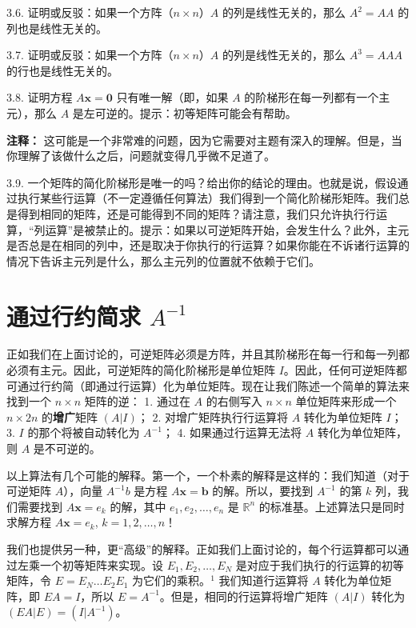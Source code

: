 3.6. 证明或反驳：如果一个方阵（$n \times n$）$A$ 的列是线性无关的，那么 $A^2 = AA$ 的列也是线性无关的。

3.7. 证明或反驳：如果一个方阵（$n \times n$）$A$ 的列是线性无关的，那么 $A^3 = AAA$ 的行也是线性无关的。

3.8. 证明方程 $A \mathbf{x} = \mathbf{0}$ 只有唯一解（即，如果 $A$ 的阶梯形在每一列都有一个主元），那么 $A$ 是左可逆的。提示：初等矩阵可能会有帮助。

\textbf{注释：} 这可能是一个非常难的问题，因为它需要对主题有深入的理解。但是，当你理解了该做什么之后，问题就变得几乎微不足道了。

3.9. 一个矩阵的简化阶梯形是唯一的吗？给出你的结论的理由。也就是说，假设通过执行某些行运算（不一定遵循任何算法）我们得到一个简化阶梯形矩阵。我们总是得到相同的矩阵，还是可能得到不同的矩阵？请注意，我们只允许执行行运算，“列运算”是被禁止的。提示：如果以可逆矩阵开始，会发生什么？此外，主元是否总是在相同的列中，还是取决于你执行的行运算？如果你能在不诉诸行运算的情况下告诉主元列是什么，那么主元列的位置就不依赖于它们。


\section{通过行约简求 $A^{-1}$}

正如我们在上面讨论的，可逆矩阵必须是方阵，并且其阶梯形在每一行和每一列都必须有主元。因此，可逆矩阵的简化阶梯形是单位矩阵 $I$。因此，任何可逆矩阵都可通过行约简（即通过行运算）化为单位矩阵。现在让我们陈述一个简单的算法来找到一个 $n \times n$ 矩阵的逆：
1. 通过在 $A$ 的右侧写入 $n \times n$ 单位矩阵来形成一个 $n \times 2n$ 的\textbf{增广}矩阵 $(A | I)$；
2. 对增广矩阵执行行运算将 $A$ 转化为单位矩阵 $I$；
3. $I$ 的那个将被自动转化为 $A^{-1}$；
4. 如果通过行运算无法将 $A$ 转化为单位矩阵，则 $A$ 是不可逆的。

以上算法有几个可能的解释。第一个，一个朴素的解释是这样的：我们知道（对于可逆矩阵 $A$），向量 $A^{-1} b$ 是方程 $A \mathbf{x} = \mathbf{b}$ 的解。所以，要找到 $A^{-1}$ 的第 $k$ 列，我们需要找到 $A \mathbf{x} = e_k$ 的解，其中 $e_1, e_2, \dots, e_n$ 是 $\mathbb{R}^n$ 的标准基。上述算法只是同时求解方程 $A \mathbf{x} = e_k$, $k = 1, 2, \dots, n$！

我们也提供另一种，更“高级”的解释。正如我们上面讨论的，每个行运算都可以通过左乘一个初等矩阵来实现。设 $E_1, E_2, \dots, E_N$ 是对应于我们执行的行运算的初等矩阵，令 $E = E_N \dots E_2 E_1$ 为它们的乘积。$^1$ 我们知道行运算将 $A$ 转化为单位矩阵，即 $EA = I$，所以 $E = A^{-1}$。但是，相同的行运算将增广矩阵 $(A | I)$ 转化为 $(EA | E) = (I | A^{-1})$。

